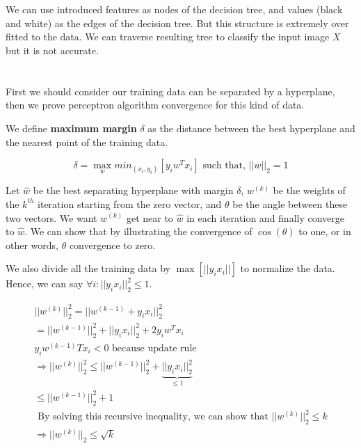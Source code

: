 \documentclass[en]{university}
\begin{document}
\setupdocument

\section{}

\subsection{}


\subsection{}

We can use introduced features as nodes of the decision tree, and values (black and white) as the edges of the decision tree. But 
this structure is extremely over fitted to the data. We can traverse resulting tree to classify the input image $X$ but it is not 
accurate.

\section{}

First we should consider our training data can be separated by a hyperplane, then we prove perceptron algorithm convergence for this kind of data.

We define \textbf{maximum margin} $\delta$ as the distance between the best hyperplane and the nearest point of the training data.

$$
    \delta = \max_w min_{(x_i, y_i)} [y_i w^T x_i] \text{ such that, } ||w||_2 = 1
$$

Let $\hat{w}$ be the best separating hyperplane with margin $\delta$, $w^{(k)}$ be the weights of the $k^{th}$ iteration starting 
from the zero vector, and $\theta$ be the angle between these two vectors. 
We want $w^{(k)}$ get near to $\hat{w}$ in each iteration and finally converge to $\hat{w}$. We can show that 
by illustrating the convergence of $\cos(\theta)$ to one, or in other words, $\theta$ convergence to zero.

We also divide all the training data by $\max[||y_i x_i||]$ to normalize the data. Hence, we can say 
$\forall i : ||y_i x_i||_2^2 \leq 1$.

\begin{gather*}
    ||w^{(k)}||_2^2 = ||w^{(k-1)} + y_i x_i||_2^2 \\
    = ||w^{(k-1)}||_2^2 + ||y_i x_i||_2^2 + 2 y_i w^T x_i \\
    y_i w^(k-1)T x_i < 0 \text{ because update rule } \\
    \Rightarrow ||w^{(k)}||_2^2 \leq ||w^{(k-1)}||_2^2 + \underbrace{||y_i x_i||_2^2}_{\leq 1} \\
    \leq ||w^{(k-1)}||_2^2 + 1 \\
    \text{ By solving this recursive inequality, we can show that } ||w^{(k)}||_2^2 \leq k \\
    \Rightarrow ||w^{(k)}||_2 \leq \sqrt{k}
\end{gather*}
\end{document}
